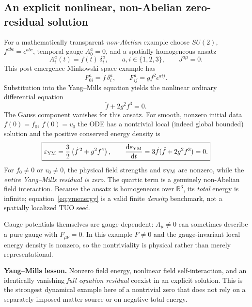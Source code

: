 \documentclass[11pt,a4paper]{article}
\newcommand{\R}{\mathbb{R}}
\newcommand{\dd}{\mathrm{d}}
\theoremstyle{tmon}
\theoremstyle{definition}
\begin{document}
\subsection{An explicit nonlinear, non-Abelian zero-residual solution}
For a mathematically transparent \emph{non-Abelian} example choose $SU(2)$, $f^{abc}=\epsilon^{abc}$, temporal gauge $A_0^a=0$, and a spatially homogeneous ansatz
\begin{equation}\label{eq:ansatz}
\boxed{A_i^a(t)=f(t)\,\delta_i^a,\qquad a,i\in\{1,2,3\},\qquad J^{a\mu}=0.}
\end{equation}
This post-emergence Minkowski-space example has
\begin{equation}
F_{0i}^a=\dot f\,\delta_i^a,
\qquad F_{ij}^a=g f^2\epsilon^{aij}.
\end{equation}
Substitution into the Yang--Mills equation yields the nonlinear ordinary differential equation
\begin{equation}\label{eq:fode}
\boxed{\ddot f+2g^2 f^3=0.}
\end{equation}
The Gauss component vanishes for this ansatz. For smooth, nonzero initial data $f(0)=f_0$, $\dot f(0)=v_0$ the ODE has a nontrivial local (indeed global bounded) solution and the positive conserved energy density is
\begin{equation}\label{eq:ymenergy}
\boxed{\varepsilon_{\rm YM}=\frac32\left(\dot f^{\,2}+g^2f^4\right),\qquad
\frac{\dd\varepsilon_{\rm YM}}{\dd t}=3\dot f(\ddot f+2g^2 f^3)=0.}
\end{equation}
For $f_0\ne0$ or $v_0\ne0$, the physical field strengths and $\varepsilon_{\rm YM}$ are nonzero, while the \emph{entire Yang--Mills residual is zero}. The quartic term is a genuinely non-Abelian field interaction. Because the ansatz is homogeneous over $\R^3$, its \emph{total} energy is infinite; equation~\eqref{eq:ymenergy} is a valid finite \emph{density} benchmark, not a spatially localized TUO seed.

Gauge potentials themselves are gauge dependent: $A_\mu\ne0$ can sometimes describe a pure gauge with $F_{\mu\nu}=0$. In this example $F\ne0$ and the gauge-invariant local energy density is nonzero, so the nontriviality is physical rather than merely representational.

\begin{keybox}
\textbf{Yang--Mills lesson.} Nonzero field energy, nonlinear field self-interaction, and an identically vanishing \emph{full equation residual} coexist in an explicit solution. This is the strongest dynamical example here of a nontrivial zero that does not rely on a separately imposed matter source or on negative total energy.
\end{keybox}
\end{document}

